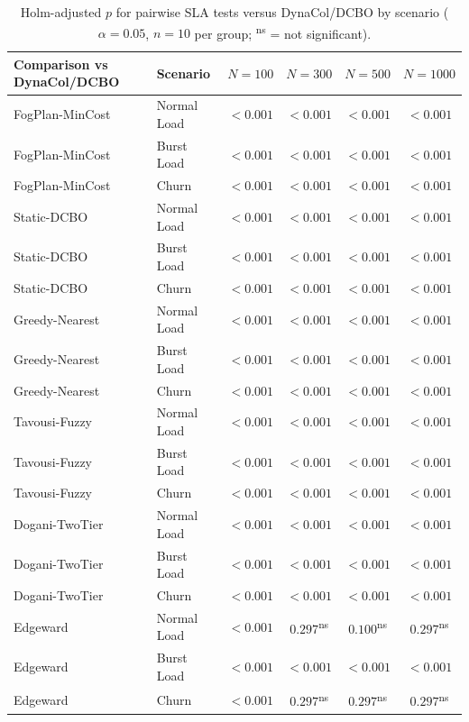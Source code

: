 \begin{table}[!t]
\centering
\caption{Holm-adjusted $p$ for pairwise SLA tests versus DynaCol/DCBO by scenario ($\alpha=0.05$, $n=10$ per group; \textsuperscript{ns} = not significant).}
\label{tab:significance}
\fgcsTablePage
\begin{tabular*}{\textwidth}{@{\extracolsep{\fill}}llcccc@{}}
\toprule
\textbf{Comparison vs DynaCol/DCBO} & \textbf{Scenario} & \textbf{$N=100$} & \textbf{$N=300$} & \textbf{$N=500$} & \textbf{$N=1000$} \\
\midrule
FogPlan-MinCost & Normal Load & $<0.001$ & $<0.001$ & $<0.001$ & $<0.001$ \\
FogPlan-MinCost & Burst Load & $<0.001$ & $<0.001$ & $<0.001$ & $<0.001$ \\
FogPlan-MinCost & Churn & $<0.001$ & $<0.001$ & $<0.001$ & $<0.001$ \\
Static-DCBO & Normal Load & $<0.001$ & $<0.001$ & $<0.001$ & $<0.001$ \\
Static-DCBO & Burst Load & $<0.001$ & $<0.001$ & $<0.001$ & $<0.001$ \\
Static-DCBO & Churn & $<0.001$ & $<0.001$ & $<0.001$ & $<0.001$ \\
Greedy-Nearest & Normal Load & $<0.001$ & $<0.001$ & $<0.001$ & $<0.001$ \\
Greedy-Nearest & Burst Load & $<0.001$ & $<0.001$ & $<0.001$ & $<0.001$ \\
Greedy-Nearest & Churn & $<0.001$ & $<0.001$ & $<0.001$ & $<0.001$ \\
Tavousi-Fuzzy & Normal Load & $<0.001$ & $<0.001$ & $<0.001$ & $<0.001$ \\
Tavousi-Fuzzy & Burst Load & $<0.001$ & $<0.001$ & $<0.001$ & $<0.001$ \\
Tavousi-Fuzzy & Churn & $<0.001$ & $<0.001$ & $<0.001$ & $<0.001$ \\
Dogani-TwoTier & Normal Load & $<0.001$ & $<0.001$ & $<0.001$ & $<0.001$ \\
Dogani-TwoTier & Burst Load & $<0.001$ & $<0.001$ & $<0.001$ & $<0.001$ \\
Dogani-TwoTier & Churn & $<0.001$ & $<0.001$ & $<0.001$ & $<0.001$ \\
Edgeward & Normal Load & $<0.001$ & $0.297$\textsuperscript{ns} & $0.100$\textsuperscript{ns} & $0.297$\textsuperscript{ns} \\
Edgeward & Burst Load & $<0.001$ & $<0.001$ & $<0.001$ & $<0.001$ \\
Edgeward & Churn & $<0.001$ & $0.297$\textsuperscript{ns} & $0.297$\textsuperscript{ns} & $0.297$\textsuperscript{ns} \\
\bottomrule
\end{tabular*}
\end{table}